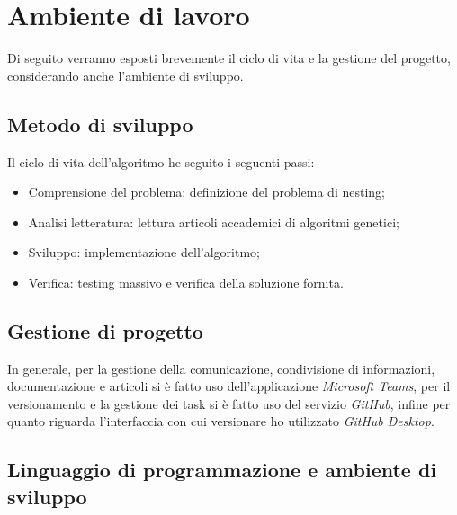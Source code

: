\section{Ambiente di lavoro}

Di seguito verranno esposti brevemente il ciclo di vita e la gestione del progetto, considerando anche l'ambiente di sviluppo.
\subsection{Metodo di sviluppo}
Il ciclo di vita dell'algoritmo he seguito i seguenti passi:
\begin{itemize}
    \item Comprensione del problema: definizione del problema di nesting;
    \item Analisi letteratura: lettura articoli accademici di algoritmi genetici;
    \item Sviluppo: implementazione dell'algoritmo;
    \item Verifica: testing massivo e verifica della soluzione fornita.
\end{itemize}

\subsection{Gestione di progetto} \hypertarget{siti}{}

In generale, per la gestione della comunicazione, condivisione di informazioni, documentazione e articoli si è fatto uso dell’applicazione \emph{Microsoft Teams}, per il versionamento e la gestione dei task si è fatto uso del servizio \emph{GitHub}, infine per quanto riguarda l’interfaccia con cui versionare ho utilizzato \emph{GitHub Desktop}.

\subsection{Linguaggio di programmazione e ambiente di sviluppo}

